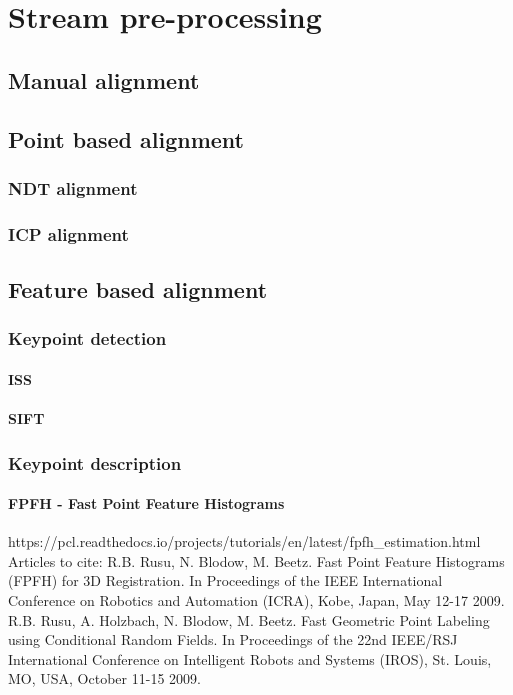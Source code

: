 \section{Stream pre-processing}

\subsection{Manual alignment}

\subsection{Point based alignment}

\subsubsection{NDT alignment}

\subsubsection{ICP alignment}

\subsection{Feature based alignment}

\subsubsection{Keypoint detection}

\paragraph{ISS}


\paragraph{SIFT}


\subsubsection{Keypoint description}

\paragraph{FPFH - Fast Point Feature Histograms}
https://pcl.readthedocs.io/projects/tutorials/en/latest/fpfh_estimation.html
Articles to cite:
R.B. Rusu, N. Blodow, M. Beetz. Fast Point Feature Histograms (FPFH) for 3D Registration. In Proceedings of the IEEE International Conference on Robotics and Automation (ICRA), Kobe, Japan, May 12-17 2009.
R.B. Rusu, A. Holzbach, N. Blodow, M. Beetz. Fast Geometric Point Labeling using Conditional Random Fields. In Proceedings of the 22nd IEEE/RSJ International Conference on Intelligent Robots and Systems (IROS), St. Louis, MO, USA, October 11-15 2009.

